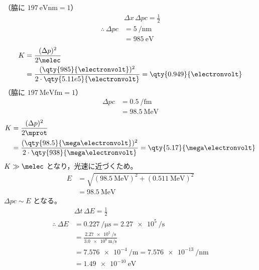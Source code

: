 （脇に $\qty{197}{\electronvolt\nano\metre}=1$）
\begin{align*}
  &\Delta x\,\Delta pc=\frac{1}{2}\\
  \therefore\ \Delta pc&=\qty{5}{\per\nano\metre}\\
  &=\qty{985}{\electronvolt}
\end{align*}
\begin{align*}
  K&=\frac{(\Delta p)^{2}}{2\melec}\\
  &=\frac{(\qty{985}{\electronvolt})^{2}}{2\cdot\qty{5.11e5}{\electronvolt}}=\qty{0.949}{\electronvolt}
\end{align*}
（脇に $\qty{197}{\mega\electronvolt\femto\metre}=1$）
\begin{align*}
  \Delta pc&=\qty{0.5}{\per\femto\metre}\\
  &=\qty{98.5}{\mega\electronvolt}
\end{align*}
\begin{align*}
  K&=\frac{(\Delta p)^{2}}{2\mprot}\\
  &=\frac{(\qty{98.5}{\mega\electronvolt})^{2}}{2\cdot\qty{938}{\mega\electronvolt}}=\qty{5.17}{\mega\electronvolt}
\end{align*}
$K\gg\melec$ となり，光速に近づくため。
\begin{align*}
  E&=\sqrt{(\qty{98.5}{\mega\electronvolt})^{2}+(\qty{0.511}{\mega\electronvolt})^{2}}\\
  &=\qty{98.5}{\mega\electronvolt}
\end{align*}
$\Delta pc\sim E$ となる。
\begin{align*}
  &\Delta t\,\Delta E=\frac{1}{2}\\
  \therefore\ \Delta E&=\qty{0.227}{\per\micro\second}=\qty{2.27e5}{\per\second}\\
  &=\frac{\qty{2.27e5}{\per\second}}{\qty{3.0e8}{\metre\per\second}}\\
  &=\qty{7.576e-4}{\per\metre}=\qty{7.576e-13}{\per\nano\metre}\\
  &=\qty{1.49e-10}{\electronvolt}
\end{align*}
